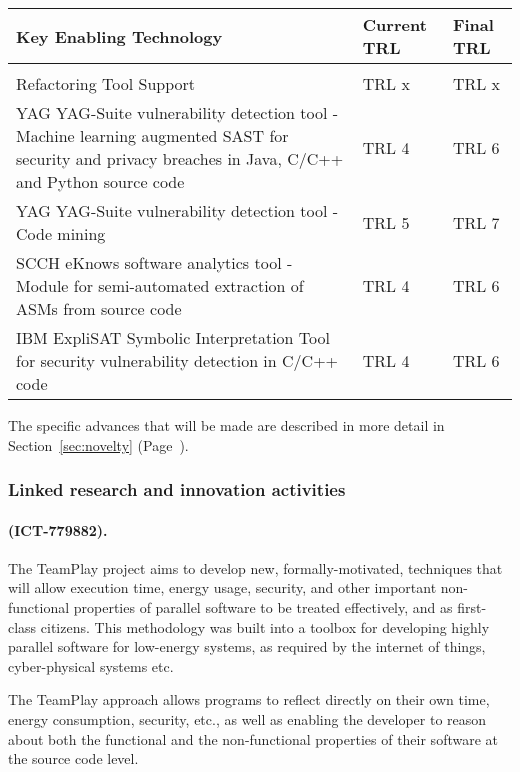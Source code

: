 \documentclass[a4paper,11pt]{article}
\begin{document}
\begin{center}
  \begin{tabular}{|p{4.9in}|l|l|}
    \hline
    \textbf{Key Enabling Technology} & \textbf{Current TRL} & \textbf{Final TRL} \\
    \hline
     &  & \\
    \hline Refactoring Tool Support & TRL x & TRL x \\  
    \hline YAG YAG-Suite vulnerability detection tool - Machine learning augmented SAST for security and privacy breaches in Java, C/C++ and Python source code & TRL 4 & TRL 6 \\  
    \hline YAG YAG-Suite vulnerability detection tool - Code mining & TRL 5 & TRL 7 \\  
    \hline SCCH eKnows software analytics tool - Module for semi-automated extraction of ASMs from source code & TRL 4 & TRL 6 \\
    \hline IBM ExpliSAT Symbolic Interpretation Tool for security vulnerability detection in C/C++ code & TRL 4 & TRL 6 \\
    \hline
  \end{tabular}
\end{center}

\noindent
The specific advances that will be made are described in more detail in Section~\ref{sec:novelty} (Page~\pageref{sec:novelty}).


\subsubsection{Linked research and innovation activities}
\label{projects}



\begin{mdframed}[backgroundcolor=blue!5]
\paragraph{\teamplay (ICT-779882).}
The TeamPlay project aims to develop new, formally-motivated, techniques that will allow execution time, energy usage, security, and other important non-functional properties of parallel software to be treated effectively, and as first-class citizens. This methodology was built into a toolbox for developing highly parallel software for low-energy systems, as required by the internet of things, cyber-physical systems etc.

The TeamPlay approach allows programs to reflect directly on their own time, energy consumption, security, etc., as well as enabling the developer to reason about both the functional and the non-functional properties of their software at the source code level.
\end{mdframed}
\end{document}

